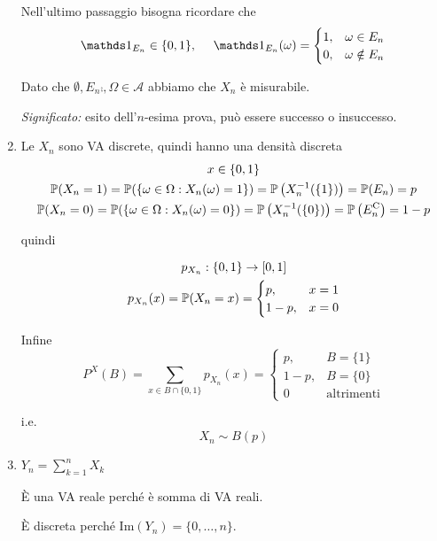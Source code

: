 \begin{enumerate}
Nell'ultimo passaggio bisogna ricordare che\begin{equation*}
\Ind_{E_{n}} \in \{0,1\} ,\ \ \ \ \Ind_{E_{n}}( \omega ) =\begin{cases}
1, & \omega \in E_{n}\\
0, & \omega \notin E_{n}
\end{cases}
\end{equation*}

Dato che $\emptyset ,E_{n}\comp ,\Omega \in \mathcal{A}$ abbiamo che $X_{n}$ è misurabile.

\textit{Significato:} esito dell'$n$-esima prova, può essere successo o insuccesso.
\item Le $X_{n}$ sono VA discrete, quindi hanno una densità discreta\begin{gather*}
x\in \{0,1\}\\
\mathbb{P}( X_{n} =1) =\mathbb{P}(\{\omega \in \Omega :X_{n}( \omega ) =1\}) =\mathbb{P}\left( X_{n}^{-1}(\{1\})\right) =\mathbb{P}( E_{n}) =p\\
\mathbb{P}( X_{n} =0) =\mathbb{P}(\{\omega \in \Omega :X_{n}( \omega ) =0\}) =\mathbb{P}\left( X_{n}^{-1}(\{0\})\right) =\mathbb{P}\left( E_{n}^{\mathrm{C}}\right) =1-p
\end{gather*}

quindi

\begin{gather*}
p_{X_{n}} :\{0,1\}\rightarrow [ 0,1]\\
p_{X_{n}}( x) =\mathbb{P}( X_{n} =x) =\begin{cases}
p, & x=1\\
1-p, & x=0
\end{cases}
\end{gather*}

Infine\begin{equation*}
P^{X}( B) =\sum\limits _{x\in B\cap \{0,1\}} p_{X_{n}}( x) =\begin{cases}
p, & B=\{1\}\\
1-p, & B=\{0\}\\
0 & \text{altrimenti}
\end{cases}
\end{equation*}

i.e.\begin{equation*}
\boxed{X_{n} \sim B( p)}
\end{equation*}
\item $Y_{n} =\sum\limits _{k=1}^{n} X_{k}$

È una VA reale perché è somma di VA reali.

È discreta perché $\mathrm{Im}( Y_{n}) =\{0,\dots ,n\}$.


\end{enumerate}
